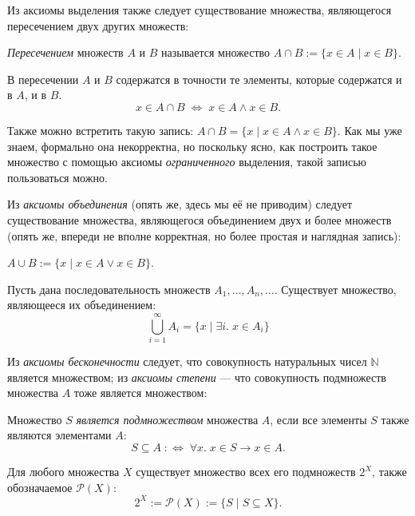 Из аксиомы выделения также следует существование множества, являющегося
пересечением двух других множеств:

\begin{defn}
  \textit{Пересечением} множеств $A$ и $B$ называется множество
  $A\cap B:=\{x\in A\;|\;x\in B\}$.
\end{defn}
\begin{impl}
  В пересечении $A$ и $B$ содержатся в точности те элементы, которые содержатся
  и в $A$, и в $B$.
  \[x\in A\cap B\;\Longleftrightarrow\;x\in A\land x\in B.\]
\end{impl}
Также можно встретить такую запись: $A\cap B=\{x\;|\;x\in A\land x\in B\}$. Как
мы уже знаем, формально она некорректна, но поскольку ясно, как построить такое
множество с помощью аксиомы \textit{ограниченного} выделения, такой записью
пользоваться можно.

Из \textit{аксиомы объединения} (опять же, здесь мы её не приводим) следует
существование множества, являющегося объединением двух и более множеств (опять
же, впереди не вполне корректная, но более простая и наглядная запись):

\begin{defn}
  $A\cup B:=\{x\;|\;x\in A\lor x\in B\}$.
\end{defn}
\begin{defn}
  Пусть дана последовательность множеств $A_1,\ldots,A_n,\ldots$. Существует
  множество, являющееся их объединением:
  \[\bigcup_{i=1}^\infty A_i = \{x\;|\;\exists i.\;x\in A_i\}
  \]
\end{defn}

Из \textit{аксиомы бесконечности} следует, что совокупность натуральных чисел
$\mathbb{N}$ является множеством; из \textit{аксиомы степени} --- что
совокупность подмножеств множества $A$ тоже является множеством:

\begin{defn}
  Множество $S$ \textit{является подмножеством} множества $A$, если все элементы
  $S$ также являются элементами $A$:
  \[
    S\subseteq A\;:\Longleftrightarrow\;\forall x.\;x\in S\to x\in A.
  \]
\end{defn}
\begin{ax}
  Для любого множества $X$ существует множество всех его подмножеств $2^X$,
  также обозначаемое $\mathcal{P}(X)$:
  \[
    2^X := \mathcal{P}(X) := \{S\;|\;S\subseteq X\}.
  \]
\end{ax}


